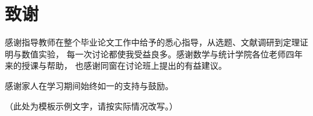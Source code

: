 \chapter*{致谢}

感谢指导教师在整个毕业论文工作中给予的悉心指导，从选题、文献调研到定理证明与数值实验，
每一次讨论都使我受益良多。感谢数学与统计学院各位老师四年来的授课与帮助，
也感谢同窗在讨论班上提出的有益建议。

感谢家人在学习期间始终如一的支持与鼓励。

（此处为模板示例文字，请按实际情况改写。）
